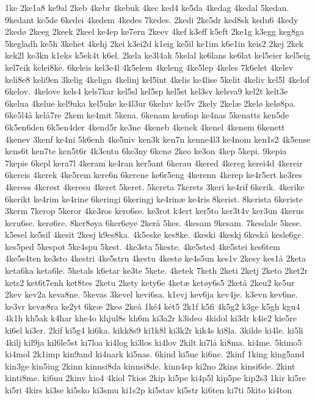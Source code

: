 {1ke
2ke1a8
ke9al
2keb
4kebr
4kebuk
4kec
ked4
ke5da
4kedag
4kedal
5kedan.
9kedant
ke5de
6kedei
4kedem
4kedes
7kedes.
2kedi
2ke5dr
ked8sk
kedu6
4kedy
2kedø
2keeg
2keek
2keel
ke4ep
ke7ern
2keev
4kef
k3eff
k5eft
2ke1g
k3egg
keg8ga
5kegladh
ke5h
3kehet
4kehj
2kei
k3ei2d
k1eig
ke5il
ke1im
k6e1in
keis2
2kej
2kek
kek2l
ke3kn
k1eks
k5ek4t
k6el.
2kela
ke3l4ak
5kelal
ke6lans
ke6lat
kel5eier
kel5eig
kel7eik
kelei8ke.
6keleis
kel3e4l
4k5elem
4keleng
4ke5lep
4keles
7k6elet
4kelev
keli8e8
keli9en
3kelig
4kelign
4kelinj
kel5int
4kelis
ke4lise
5kelit
4keliv
kel5l
4kelof
6kelov.
4kelove
kels4
kels7kar
kel5sl
kel5sp
kel5st
kel3sv
kelsva9
kel2t
kelt3e
6kelua
4kelue
kel9uka
kel5uke
ke4l3ur
6keluv
kel5v
2kely
2kelæ
2kelø
kelø8pa.
6ke5l4å
kelå7re
2kem
ke4mit
5kena.
6kenam
ken6ap
ke4nas
5kenatts
ken5de
6k5en6den
6k5en4der
4kend5r
ke3ne
4keneb
4kenek
4kenel
4kenem
6kenett
4kenev
3kenf
ke4ni
5k6enh
4ke5niv
ken3k
ken7n
kenne4l3
ke4nom
ken1s2
4k5ense
kens6t
ken7te
ken5t6r
4k3entu
6ke3ny
6kenø
2keo
ke3on
4kep
5kepi.
9kepia
7kepie
6kepl
kera7l
4keram
ke4ran
ker5ant
6kerau
4kered
4kereg
kerei4d
4kereir
6kereis
4kerek
4ke5rem
kere6n
6kerene
ke6r5eng
4kerenn
4kerep
ke4r5ert
ke3res
4keress
4kerest
4keresu
4keret
5keret.
5kereta
7kerets
3keri
ke4rif
6kerik.
4kerike
6kerikt
ke4rim
ke4rine
6keringi
6keringj
ke4rinæ
ke4ris
8kerist.
8kerista
6keriste
3kerm
7kerop
5keror
4ke3ros
kero6se.
ke3rot
k4ert
ker5to
ker3t4v
ker3un
4kerus
keru6se.
kerø6re.
8ker8øya
6ker6øye
2kerå
5kes.
4kesam
9kesam.
7kesdale
5kese.
k5esel
ke5sil
4kesit
2kesj
k9es8ka.
4k5eske
kes8ke.
4keski
4keskj
6keskå
kesle6ge.
kes5ped
5kespot
5ke4spu
5kest.
4ke3sta
5keste.
4ke5sted
4ke5stei
kes6tem
4ke5s4ten
ke3sto
4kestri
4ke5stru
4kestu
4kestø
ke4s5un
kes1v
2kesy
kes1å
2keta
keta6ka
keta6le.
5ketals
k6etar
ke3te
5kete.
4ketek
7keth
2keti
2ketj
2keto
2ket2r
kets2
ket6t7enh
ket8tes
2ketu
2kety
kety6e
4ketæ
ketøy6s5
2ketå
2keu2
ke5ur
2kev
kev2a
keva8ne.
5kevas
3kevel
kevi6sa.
k1evj
kev6ja
kev4je.
k3evn
kev6ne.
ke3vr
kevæ8ra
ke2yt
6keæ
2keø
2keå
1ké4
két5
2k1f
k5fi
4k5g2
k3ge
k5gh
kgu4
4k1h
kh5ak
k4har
khe4o
khjul8s
kh6m
ki3a2r
k3ideo
4kidol
ki3dr
k4ie2
kie5re
ki6el
ki3er.
2kif
ki5g4
ki6ka.
kikk8s9
ki1k8l
ki3k2r
kik4s
ki8la.
3kilde
ki4le.
ki5li
4kilj
kil9ja
kil6le5st
ki7loa
ki4log
ki3los
ki4lov
2kilt
ki7lå
ki8ma.
ki4me.
5kimo5
ki4mol
2k1imp
kin9and
ki4nark
ki5nas.
6kind
ki5ne
ki6ne.
2kinf
1king
king5and
kin3ge
kin5ing
2kinn
kinnsi8da
kinnsi8de.
kinn4sp
ki2no
2kins
kinsi6de.
2kint
kinti8me.
ki6nu
2kinv
kio4
4kiol
7kios
2kip
ki5pe
ki4p5l
kip5pe
kip2s3
1kir
ki5re
ki5ri
4kirs
ki3se
ki5sko
ki3smu
ki1s2p
ki5stav
ki5str
ki6ten
ki7ti
5kito
ki4ton
}
